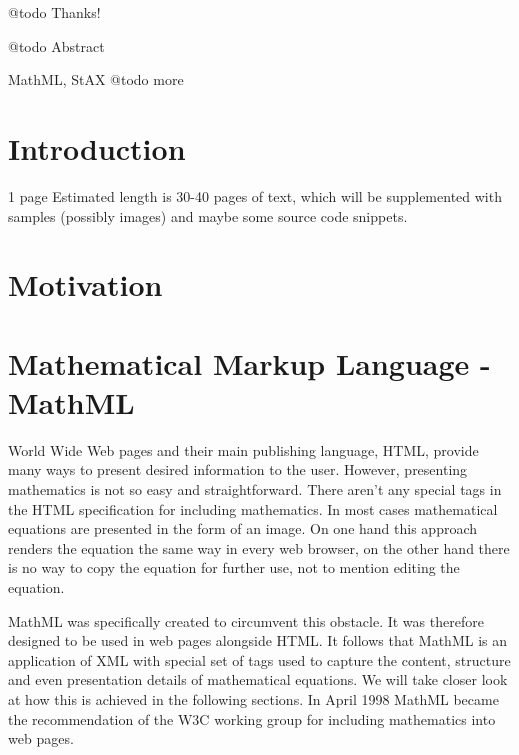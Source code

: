 \documentclass[11pt,oneside,final]{fithesis2}
\begin{document}



\FrontMatter
\ThesisTitlePage

\begin{ThesisDeclaration}
\DeclarationText
\AdvisorName
\end{ThesisDeclaration}

\begin{ThesisThanks}
@todo Thanks!
\end{ThesisThanks}

\begin{ThesisAbstract}
@todo Abstract
\end{ThesisAbstract}

\begin{ThesisKeyWords}
MathML, StAX  @todo more
\end{ThesisKeyWords}

\MainMatter
\tableofcontents

\chapter{Introduction}
1 page
Estimated length is 30-40 pages of text, which will be supplemented with samples (possibly images) and maybe some source code snippets.

\chapter{Motivation}

\chapter{Mathematical Markup Language - MathML}
World Wide Web pages and their main publishing language, HTML, provide many ways to present desired information to the user. However, presenting mathematics is not so easy and straightforward. There aren't any special tags in the HTML specification for including mathematics. In most cases mathematical equations are presented in the form of an image. On one hand this approach renders the equation the same way in every web browser, on the other hand there is no way to copy the equation for further use, not to mention editing the equation. 

MathML was specifically created to circumvent this obstacle. It was therefore designed to be used in web pages alongside HTML. It follows that MathML is an application of XML with special set of tags used to capture the content, structure and even presentation details of mathematical equations. We will take closer look at how this is achieved in the following sections. In April 1998 MathML became the recommendation of the W3C working group for including mathematics into web pages.
\end{document}
